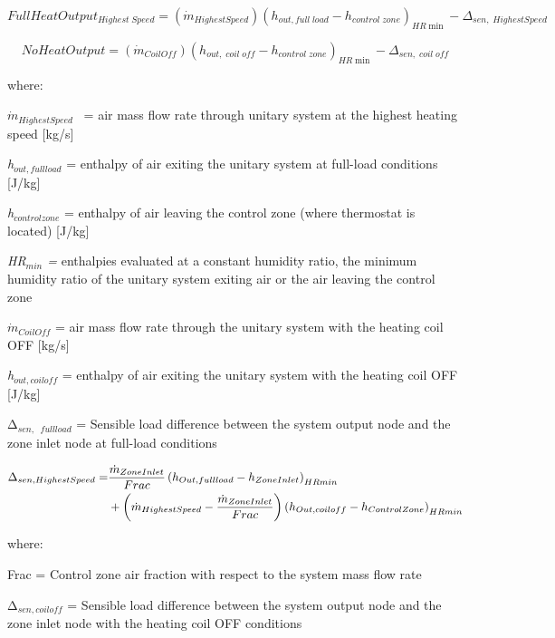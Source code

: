\begin{equation}
FullHeatOutpu{t_{Highest\;Speed}} = ({\dot m_{HighestSpeed}}){({h_{out,full\;load}} - {h_{control\;zone}})_{HR\min }} - {\Delta_{sen,\;HighestSpeed}}
\end{equation}

\begin{equation}
NoHeatOutput = ({\dot m_{CoilOff}}){({h_{out,\;coil\;off}} - {h_{control\;zone}})_{HR\min }} - {\Delta_{sen,\;coil\;off}}
\end{equation}

where:

\emph{\({\dot m_{HighestSpeed}}\)}~ = air mass flow rate through unitary system at the highest heating speed {[}kg/s{]}

\emph{h\(_{out, full load}\)} = enthalpy of air exiting the unitary system at full-load conditions {[}J/kg{]}

\emph{h\(_{control zone}\)} = enthalpy of air leaving the control zone (where thermostat is located) {[}J/kg{]}

\emph{HR\(_{min}\) =} enthalpies evaluated at a constant humidity ratio, the minimum humidity ratio of the unitary system exiting air or the air leaving the control zone

\({\dot m_{CoilOff}}\) = air mass flow rate through the unitary system with the heating coil OFF {[}kg/s{]}

\emph{h\(_{out,coil off}\)} = enthalpy of air exiting the unitary system with the heating coil OFF {[}J/kg{]}

Δ\(_{sen,}\) \emph{\(_{full load}\)} = Sensible load difference between the system output node and the zone inlet node at full-load conditions

\begin{equation}
  \begin{split}
    \Delta_{sen,HighestSpeed} =& \frac{\dot{m}_{ZoneInlet}}{Frac} \PB{h_{Out,full load} - h_{ZoneInlet}}_{HRmin} \\
                              &+ \PB{\dot{m}_{HighestSpeed} - \frac{\dot{m}_{ZoneInlet}}{Frac}} \PB{h_{Out,coil off} - h_{ControlZone}}_{HRmin}
  \end{split}
\end{equation}

where:

Frac = Control zone air fraction with respect to the system mass flow rate

Δ\emph{\(_{sen,coil off}\)} = Sensible load difference between the system output node and the zone inlet node with the heating coil OFF conditions

